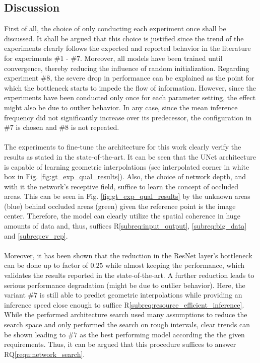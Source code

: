\subsection{Discussion}
\label{subsec:discussion_unet_arch}
First of all, the choice of only conducting each experiment once shall be discussed. It shall be argued that this choice is justified since the trend of the experiments clearly follows the expected and reported behavior in the literature for experiments $\#1$ - $\#7$. Moreover, all models have been trained until convergence, thereby reducing the influence of random initialization. Regarding experiment $\#8$, the severe drop in performance can be explained as the point for which the bottleneck starts to impede the flow of information. However, since the experiments have been conducted only once for each parameter setting, the effect might also be due to outlier behavior. In any case, since the mean inference frequency did not significantly increase over its predecessor, the configuration in $\#7$ is chosen and $\#8$ is not repeated.  
\\\\
The experiments to fine-tune the architecture for this work clearly verify the results as stated in the state-of-the-art. It can be seen that the UNet architecture is capable of learning geometric interpolations (see interpolated corner in white box in Fig. \ref{fig:gt_exp_qual_results}). Also, the choice of network depth, and with it the network's receptive field, suffice to learn the concept of occluded areas. This can be seen in Fig. \ref{fig:gt_exp_qual_results} by the unknown areas (blue) behind occluded areas (green) given the reference point is the image center. Therefore, the model can clearly utilize the spatial coherence in huge amounts of data and, thus, suffices R\ref{subreq:input_output}, \ref{subreq:big_data} and \ref{subreq:ev_rep}.
\\\\
Moreover, it has been shown that the reduction in the ResNet layer's bottleneck can be done up to factor of $0.25$ while almost keeping the performance, which validates the results reported in the state-of-the-art. A further reduction leads to serious performance degradation (might be due to outlier behavior). Here, the variant $\#7$ is still able to predict geometric interpolations while providing an inference speed close enough to suffice R\ref{subreq:resource_efficient_inference}. While the performed architecture search used many assumptions to reduce the search space and only performed the search on rough intervals, clear trends can be shown leading to $\#7$ as the best performing model according the the given requirements. Thus, it can be argued that this procedure suffices to answer RQ\ref{requ:network_search}.
%
